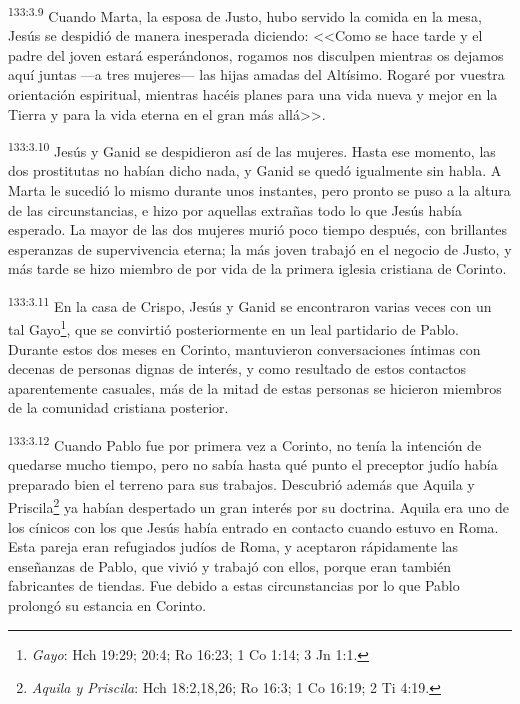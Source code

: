 \par 
\textsuperscript{133:3.9} Cuando Marta, la esposa de Justo, hubo servido la comida en la mesa, Jesús se despidió de manera inesperada diciendo: <<Como se hace tarde y el padre del joven estará esperándonos, rogamos nos disculpen mientras os dejamos aquí juntas ---a tres mujeres--- las hijas amadas del Altísimo. Rogaré por vuestra orientación espiritual, mientras hacéis planes para una vida nueva y mejor en la Tierra y para la vida eterna en el gran más allá>>.

\par 
\textsuperscript{133:3.10} Jesús y Ganid se despidieron así de las mujeres. Hasta ese momento, las dos prostitutas no habían dicho nada, y Ganid se quedó igualmente sin habla. A Marta le sucedió lo mismo durante unos instantes, pero pronto se puso a la altura de las circunstancias, e hizo por aquellas extrañas todo lo que Jesús había esperado. La mayor de las dos mujeres murió poco tiempo después, con brillantes esperanzas de supervivencia eterna; la más joven trabajó en el negocio de Justo, y más tarde se hizo miembro de por vida de la primera iglesia cristiana de Corinto.

\par 
\textsuperscript{133:3.11} En la casa de Crispo, Jesús y Ganid se encontraron varias veces con un tal Gayo\footnote{\textit{Gayo}: Hch 19:29; 20:4; Ro 16:23; 1 Co 1:14; 3 Jn 1:1.}, que se convirtió posteriormente en un leal partidario de Pablo. Durante estos dos meses en Corinto, mantuvieron conversaciones íntimas con decenas de personas dignas de interés, y como resultado de estos contactos aparentemente casuales, más de la mitad de estas personas se hicieron miembros de la comunidad cristiana posterior.

\par 
\textsuperscript{133:3.12} Cuando Pablo fue por primera vez a Corinto, no tenía la intención de quedarse mucho tiempo, pero no sabía hasta qué punto el preceptor judío había preparado bien el terreno para sus trabajos. Descubrió además que Aquila y Priscila\footnote{\textit{Aquila y Priscila}: Hch 18:2,18,26; Ro 16:3; 1 Co 16:19; 2 Ti 4:19.} ya habían despertado un gran interés por su doctrina. Aquila era uno de los cínicos con los que Jesús había entrado en contacto cuando estuvo en Roma. Esta pareja eran refugiados judíos de Roma, y aceptaron rápidamente las enseñanzas de Pablo, que vivió y trabajó con ellos, porque eran también fabricantes de tiendas. Fue debido a estas circunstancias por lo que Pablo prolongó su estancia en Corinto.

